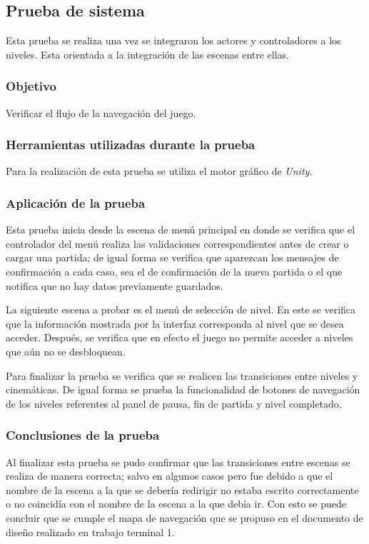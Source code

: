 \subsection{Prueba de sistema}
Esta prueba se realiza una vez se integraron los actores y controladores a los
niveles. Esta orientada a la integración de las escenas entre ellas.

\subsubsection{Objetivo}
Verificar el flujo de la navegación del juego.

\subsubsection{Herramientas utilizadas durante la prueba}
Para la realización de esta prueba se utiliza el motor gráfico de \textit{Unity.}

\subsubsection{Aplicación de la prueba}
Esta prueba inicia desde la escena de menú principal en donde se verifica que
el controlador del menú realiza las validaciones correspondientes antes de
crear o cargar una partida; de igual forma se verifica que aparezcan los
mensajes de confirmación a cada caso, sea el de confirmación de la nueva partida
o el que notifica que no hay datos previamente guardados.
\\
\par
La siguiente escena a probar es el menú de selección de nivel. En este se verifica
que la información mostrada por la interfaz corresponda al nivel que se desea
acceder. Después, se verifica que en efecto el juego no permite acceder a niveles
que aún no se desbloquean.
\\
\par
Para finalizar la prueba se verifica que se realicen las transiciones entre
niveles y cinemáticas. De igual forma se prueba la funcionalidad de botones de
navegación de los niveles referentes al panel de pausa, fin de partida y nivel
completado.

\subsubsection{Conclusiones de la prueba}
Al finalizar esta prueba se pudo confirmar que las transiciones entre escenas se
realiza de manera correcta; salvo en algunos casos pero fue debido a que el nombre
de la escena a la que se debería redirigir no estaba escrito correctamente o no
coincidía con el nombre de la escena a la que debía ir. Con esto se puede concluir
que se cumple el mapa de navegación que se propuso en el documento de diseño
realizado en trabajo terminal 1.

